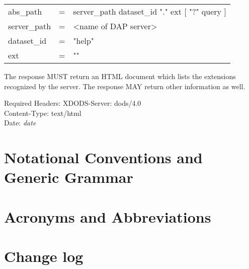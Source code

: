 \documentclass[justify]{dods-paper}
\begin{document}
\begin{ttfamily}
\begin{center}
\begin{tabular}{lll}
abs\_path & = & server\_path dataset\_id "." ext [ "?" query ] \\
server\_path & = & <name of DAP server> \\
dataset\_id & = & "help" \\
ext & = & "" \\
\end{tabular}
\end{center}
\end{ttfamily}

The \HELP response MUST return an HTML document which lists
the extensions recognized by the server. The response MAY return other
information as well.

\begin{textoutput}{Required Headers:}
XDODS-Server: dods/4.0\\
Content-Type: text/html\\
Date: \emph{date}
\end{textoutput}



\T{}
\T\raggedright


\appendix

\section{Notational Conventions and Generic Grammar}
\label{app:grammar}


\section{Acronyms and Abbreviations}
\begin{acronym}

\end{acronym}

\section{Change log}
\end{document}
